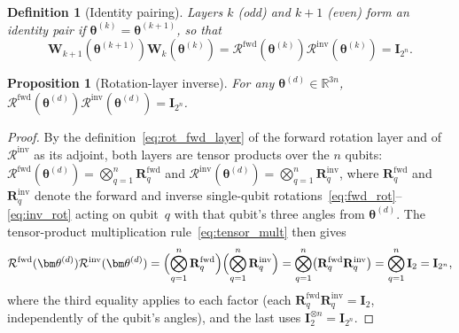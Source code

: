 \documentclass[11pt]{article}
\newcommand{\bbR}{\mathbb{R}}
\newtheorem{proposition}[theorem]{Proposition}
\theoremstyle{plain}
\newtheorem{definition}[theorem]{Definition}
\theoremstyle{plain}
\begin{document}
\begin{definition}[Identity pairing]\label{def:id_pair}
  Layers $k$ (odd) and $k+1$ (even) form an \emph{identity pair} if
  $\bm\theta^{(k)}=\bm\theta^{(k+1)}$, so that
  \begin{equation}\label{eq:id_pair}
    \mathbf{W}_{k+1}(\bm\theta^{(k+1)}) \mathbf{W}_k(\bm\theta^{(k)})
    =\mathcal{R}^{\mathrm{fwd}}(\bm\theta^{(k)}) 
     \mathcal{R}^{\mathrm{inv}}(\bm\theta^{(k)})
    =\mathbf{I}_{2^n}.
  \end{equation}
\end{definition}
\begin{proposition}[Rotation-layer inverse]\label{prop:block_inv}
  For any $\bm\theta^{(d)}\in\bbR^{3n}$,
  $\mathcal{R}^{\mathrm{fwd}}(\bm\theta^{(d)}) 
  \mathcal{R}^{\mathrm{inv}}(\bm\theta^{(d)})=\mathbf{I}_{2^n}$.
\end{proposition}
\begin{proof}
By the definition~\eqref{eq:rot_fwd_layer} of the forward rotation
layer and of $\mathcal{R}^{\mathrm{inv}}$ as its adjoint, both layers are
tensor products over the $n$ qubits:
$\mathcal{R}^{\mathrm{fwd}}(\bm\theta^{(d)})=\bigotimes_{q=1}^n
\mathbf{R}^{\mathrm{fwd}}_q$ and
$\mathcal{R}^{\mathrm{inv}}(\bm\theta^{(d)})=\bigotimes_{q=1}^n
\mathbf{R}^{\mathrm{inv}}_q$, where $\mathbf{R}^{\mathrm{fwd}}_q$ and
$\mathbf{R}^{\mathrm{inv}}_q$ denote the forward and inverse single-qubit
rotations~\eqref{eq:fwd_rot}--\eqref{eq:inv_rot} acting on qubit~$q$
with that qubit's three angles from $\bm\theta^{(d)}$. The
tensor-product multiplication rule~\eqref{eq:tensor_mult} then gives
\begin{equation}\label{eq:block_inv_chain}
  \mathcal{R}^{\mathrm{fwd}}(\bm\theta^{(d)}) 
  \mathcal{R}^{\mathrm{inv}}(\bm\theta^{(d)})
  = \Bigl(\bigotimes_{q=1}^{n}\mathbf{R}^{\mathrm{fwd}}_q\Bigr)
    \Bigl(\bigotimes_{q=1}^{n}\mathbf{R}^{\mathrm{inv}}_q\Bigr)
  = \bigotimes_{q=1}^{n}
    \bigl(\mathbf{R}^{\mathrm{fwd}}_q \mathbf{R}^{\mathrm{inv}}_q\bigr)
  = \bigotimes_{q=1}^{n}\mathbf{I}_2
  = \mathbf{I}_{2^n},
\end{equation}
where the third equality applies  to each
factor (each $\mathbf{R}^{\mathrm{fwd}}_q \mathbf{R}^{\mathrm{inv}}_q=\mathbf{I}_2$,
independently of the qubit's angles), and the last uses
$\mathbf{I}_2^{\otimes n}=\mathbf{I}_{2^n}$.
\end{proof}
\end{document}
